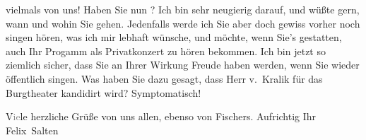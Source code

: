 \begin{ledgroupsized}[t]{13cm}
               vielmals von uns! Haben Sie
               nun \label{K_L03560-4v}\label{K_L03560-4h}? Ich bin sehr neugierig darauf, und wüßte gern,
               wann und wohin Sie gehen. Jedenfalls werde ich Sie aber doch gewiss vorher noch
               singen hören, was ich mir lebhaft wünsche, und möchte, wenn Sie’s gestatten, auch Ihr
               Progamm als Privatkonzert zu hören bekommen. Ich bin jetzt so ziemlich sicher, dass
               Sie an Ihrer Wirkung Freude haben werden, wenn Sie wieder öffentlich singen.\pend
           \pstart
           Was haben Sie dazu gesagt, dass Herr v. Kralik
               für das Burgtheater kandidirt wird?
               Symptomatisch!\pend
           \pstart
           
               V\textcolor{gray}{ie}le herzliche Grüße von uns allen, ebenso von Fischers.\pend
           \pstart Aufrichtig Ihr \spacefill\mbox{Felix Salten}\pend{}
         
         \endnumbering{}\end{ledgroupsized}  \newcommand{\dateiname}{L03560}\newcommand{\titel}{Felix Salten an Olga Schnitzler, 2. 9. 1912}\newcommand{\editorInnen}{Martin Anton Müller und Laura Untner}
      